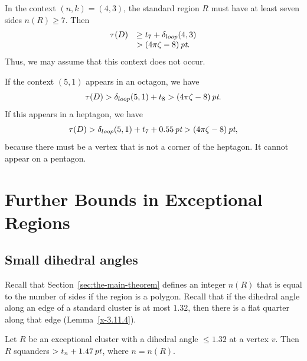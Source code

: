In the context $(n,k)=(4,3)$, the standard region $R$ must have at
least seven sides $n(R)\ge7$.   Then
    $$
    \begin{array}{lll}
    \tau(D)&\ge t_7+{\delta}_{loop}(4,3)\\
            &>(4\pi\zeta-8)\,\hbox{\it pt}.
    \end{array}
    $$
Thus, we may assume that this context does not occur.

If the context $(5,1)$ appears in an octagon, we have
    $$\tau(D) >{\delta}_{loop}(5,1)+t_8>(4\pi\zeta-8)\,\hbox{\it pt}.$$
If this appears in a heptagon, we have
$$\tau(D) >{\delta}_{loop}(5,1) + t_7+ 0.55\,\hbox{\it pt} > (4\pi\zeta-8)\,\hbox{\it pt},$$
because there must be a vertex that is not a corner of the
heptagon. It cannot appear on a pentagon.





\chapter{Further Bounds in Exceptional Regions}
    \label{sec:fb}

\section{Small dihedral angles}\label{sec:small-dih}

Recall that Section~\ref{sec:the-main-theorem} defines an integer $n(R)$
that is equal to the number of sides if the region is a polygon.  Recall
that if the dihedral angle along an edge of a standard cluster is at
most $1.32$, then there is a flat quarter along that edge
(Lemma~\ref{x-3.11.4}).

\begin{lemma}
Let $R$ be an exceptional cluster with a dihedral angle
$\le1.32$ at a vertex $v$. Then $R$ squanders $>t_n+1.47\,\hbox{\it pt}$, where
$n=n(R)$.
\end{lemma}

